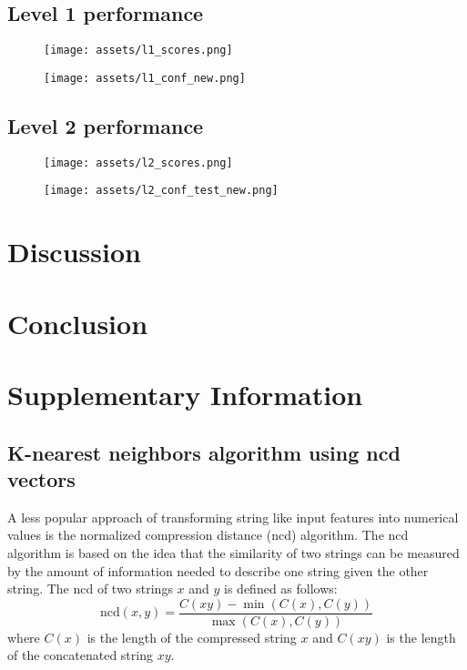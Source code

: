 \documentclass{bioinfo}
\begin{document}
\subsection{Level 1 performance}

\begin{figure}[!htpb]
\texttt{[image: assets/l1\_scores.png]}
\caption{}\label{fig:FNN_scores_l1}
\end{figure}

\begin{figure}[!htpb]
\texttt{[image: assets/l1\_conf\_new.png]}
\caption{}\label{fig:FNN_conf_l1}
\end{figure}
\subsection{Level 2 performance}

\begin{figure}[!htpb]
\texttt{[image: assets/l2\_scores.png]}
\caption{}\label{fig:FNN_scores_l2}
\end{figure}

\begin{figure}[!htpb]
\texttt{[image: assets/l2\_conf\_test\_new.png]}
\caption{}\label{fig:FNN_conf_l2}
\end{figure}

\section{Discussion}

\section{Conclusion}

\section{Supplementary Information}

\subsection{K-nearest neighbors algorithm using ncd vectors}
A less popular approach of transforming string like input features into numerical values is the normalized compression distance (ncd) algorithm. 
The ncd algorithm is based on the idea that the similarity of two strings can be measured by the amount of information needed to describe one string given the other string. The ncd of two strings $x$ and $y$ is defined as follows:
\begin{equation}
	\text{ncd}(x,y) = \frac{C(xy)-\min(C(x),C(y))}{\max(C(x),C(y))}
\end{equation}
where $C(x)$ is the length of the compressed string $x$  and $C(xy)$ is the length of the concatenated string $xy$. 
\end{document}
